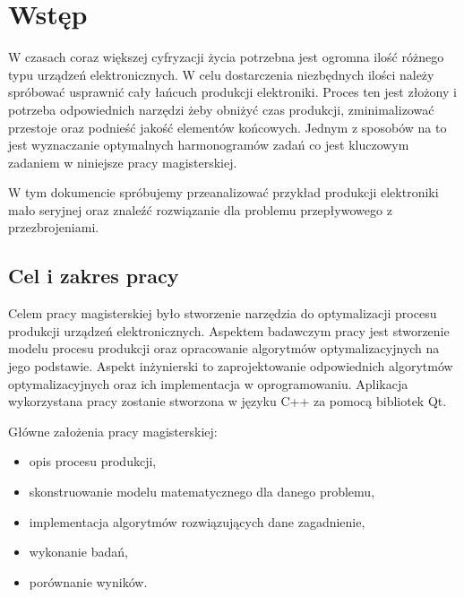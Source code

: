 \chapter{Wstęp}

W czasach coraz większej cyfryzacji życia potrzebna jest ogromna ilość różnego typu urządzeń elektronicznych.
W celu dostarczenia niezbędnych ilości należy spróbować usprawnić cały łańcuch produkcji elektroniki. Proces ten jest złożony i potrzeba odpowiednich narzędzi żeby obniżyć czas produkcji, zminimalizować przestoje oraz podnieść jakość elementów końcowych. Jednym z sposobów na to jest wyznaczanie optymalnych harmonogramów zadań co jest kluczowym zadaniem w niniejsze pracy magisterskiej.

W tym dokumencie spróbujemy przeanalizować przykład produkcji elektroniki mało seryjnej oraz znaleźć rozwiązanie dla problemu przepływowego z przezbrojeniami.

\section{Cel i zakres pracy}
Celem pracy magisterskiej było stworzenie narzędzia do optymalizacji procesu produkcji urządzeń elektronicznych.
Aspektem badawczym pracy jest stworzenie modelu procesu produkcji oraz opracowanie algorytmów optymalizacyjnych na jego podstawie.
Aspekt inżynierski to zaprojektowanie odpowiednich algorytmów optymalizacyjnych oraz ich implementacja w oprogramowaniu. Aplikacja wykorzystana pracy zostanie stworzona w języku C++ za pomocą bibliotek Qt.

\breakparagraph{}
Główne założenia pracy magisterskiej:
\begin{itemize}
	\item opis procesu produkcji,
	\item skonstruowanie modelu matematycznego dla danego problemu,
	\item implementacja algorytmów rozwiązujących dane zagadnienie,
	\item wykonanie badań,
	\item porównanie wyników.
\end{itemize}
